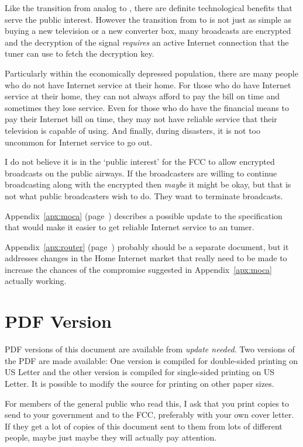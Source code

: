 Like the transition from analog to , there are definite technological benefits that serve
the public interest. However the transition from  to  is not just as simple as
buying a new television or a new converter box, many  broadcasts are encrypted and the
decryption of the signal \emph{requires} an active Internet connection that the tuner can use to
fetch the decryption key.

Particularly within the economically depressed population, there are many people who do not have
Internet service at their home. For those who do have Internet service at their home, they can
not always afford to pay the bill on time and sometimes they lose service. Even for those who
do have the financial means to pay their Internet bill on time, they may not have reliable service
that their television is capable of using. And finally, during disasters, it is not too uncommon
for Internet service to go out.

I do not believe it is in the `public interest' for the FCC to allow encrypted broadcasts on the
public airways. If the broadcasters are willing to continue broadcasting  along with
the encrypted  then \emph{maybe} it might be okay, but that is not what public broadcasters
wish to do. They want to terminate  broadcasts.


Appendix~\ref{apx:moca} (page~\pageref{apx:moca}) describes a possible update to the \ngtv{}
specification that would make it easier to get reliable Internet service to an 
tumer.

Appendix~\ref{apx:router} (page~\pageref{apx:router}) probably should be a separate document,
but it addresses changes in the Home Internet market that really need to be made to increase
the chances of the compromise suggested in Appendix~\ref{apx:moca} actually working.

\section*{PDF Version}
PDF versions of this document are available from \textit{update needed}. Two versions of the
PDF are made available: One version is compiled for double-sided printing on US Letter and the
other version is compiled for single-sided printing on US Letter. It is possible to modify
the source for printing on other paper sizes.

For members of the general public who read this, I ask that you print copies to send to your
government and to the FCC, preferably with your own cover letter. If they get a lot of copies
of this document sent to them from lots of different people, maybe just maybe they will actually
pay attention.

